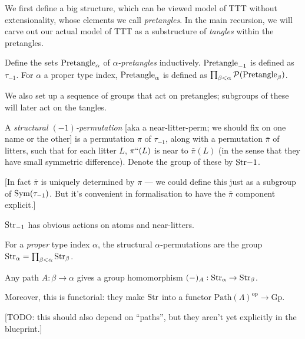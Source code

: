 We first define a big structure, which can be viewed model of TTT without extensionality, whose elements we call \emph{pretangles}.  In the main recursion, we will carve out our actual model of TTT as a substructure of \emph{tangles} within the pretangles.

\begin{definition}
  \label{def:pretangle}
  \leanok
  Define the sets $\mathrm{Pretangle}_\alpha$ of \emph{$\alpha$-pretangles} inductively. $\mathrm{Pretangle}_{-1}$ is defined as $\tau_{-1}$. For $\alpha$ a proper type index, $\mathrm{Pretangle}_\alpha$ is defined as $\prod_{\beta < \alpha} \mathcal{P}(\mathrm{Pretangle}_\beta)$.
\end{definition}

We also set up a sequence of groups that act on pretangles; subgroups of these will later act on the tangles.

\begin{definition}
  \label{def:structural-perm-atoms}
  \leanok

  A \emph{structural $(-1)$-permutation} [aka a near-litter-perm; we should fix on one name or the other] is a permutation $\pi$ of $\tau_{-1}$, along with a permutation $\bar{\pi}$ of litters, such that for each litter $L$, $\pi``(L)$ is near to $\bar{\pi}(L)$ (in the sense that they have small symmetric difference).  Denote the group of these by $\mathrm{Str}{-1}$.

  [In fact $\bar{\pi}$ is uniquely determined by $\pi$ — we could define this just as a subgroup of $\mathrm{Sym}(\tau_{-1})$.  But it’s convenient in formalisation to have the $\bar{\pi}$ component explicit.]

  $\mathrm{Str}_{-1}$ has obvious actions on atoms and near-litters.
\end{definition}

\begin{definition}
  \label{def:structural-perm}
  \leanok
  For a \emph{proper} type index $\alpha$, the structural $\alpha$-permutations are the group $\mathrm{Str}_\alpha = \prod_{\beta < \alpha} \mathrm{Str}_\beta$.
\end{definition}

\begin{definition}
  \label{def:structural-perm-derivative}
  \leanok
  Any path $A : \beta \to \alpha$ gives a group homomorphism $(-)_A : \mathrm{Str}_\alpha \to \mathrm{Str}_\beta$.

  Moreover, this is functorial: they make $\mathrm{Str}$ into a functor $\mathrm{Path}(\Lambda)^\mathrm{op} \to \mathrm{Gp}$.

  [TODO: this should also depend on “paths”, but they aren’t yet explicitly in the blueprint.]
\end{definition}

